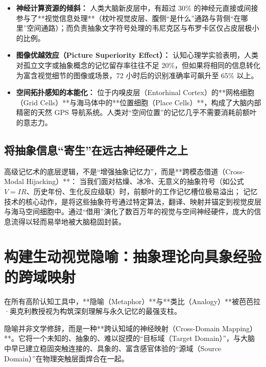 \documentclass[12pt,a4paper,openany]{ctexbook}
\begin{document}
\begin{keypoint}[图像与空间记忆的演化优势]
\begin{itemize}
    \item \textbf{神经计算资源的倾斜：} 人类大脑新皮层中，有超过 30\% 的神经元直接或间接参与了**视觉信息处理**（枕叶视觉皮层、腹侧“是什么”通路与背侧“在哪里”空间通路）；而负责抽象文字符号处理的韦尼克区与布罗卡区仅占皮层极小的比例。
    \item \textbf{图像优越效应（Picture Superiority Effect）：} 认知心理学实验表明，人类对孤立文字或抽象概念的记忆留存率往往不足 20\%，但如果将相同的信息转化为富含视觉细节的图像或场景，72 小时后的识别准确率可飙升至 65\% 以上。
    \item \textbf{空间拓扑感知的本能化：} 位于内嗅皮层（Entorhinal Cortex）的**网格细胞（Grid Cells）**与海马体中的**位置细胞（Place Cells）**，构成了大脑内部精密的天然 GPS 导航系统。人类对“空间位置”的记忆几乎不需要消耗前额叶的意志力。
\end{itemize}
\end{keypoint}

\subsection*{将抽象信息“寄生”在远古神经硬件之上}

高级记忆术的底层逻辑，不是“增强抽象记忆力”，而是**跨模态借道（Cross-Modal Hijacking）**：
当我们面对枯燥、冰冷、无意义的抽象符号（如公式 $V = IR$、历史年份、生化反应级联）时，前额叶的工作记忆槽位极易溢出；
记忆技术的核心动作，是将这些抽象符号通过特定算法，翻译、映射并锚定到视觉皮层与海马空间细胞中。通过“借用”演化了数百万年的视觉与空间神经硬件，庞大的信息流得以轻而易举地被大脑稳固封装。

\section{构建生动视觉隐喻：抽象理论向具象经验的跨域映射}

在所有高阶认知工具中，**隐喻（Metaphor）**与**类比（Analogy）**被芭芭拉·奥克利教授视为构筑深刻理解与永久记忆的最强支柱。

\begin{keypoint}[视觉隐喻的定义与认知神经学本质]
隐喻并非文学修辞，而是一种**跨认知域的神经映射（Cross-Domain Mapping）**。它将一个未知的、抽象的、难以捉摸的“目标域（Target Domain）”，与大脑中早已建立稳固突触连接的、具象的、富含感官体验的“源域（Source Domain）”在物理突触层面焊合在一起。
\end{keypoint}
\end{document}

